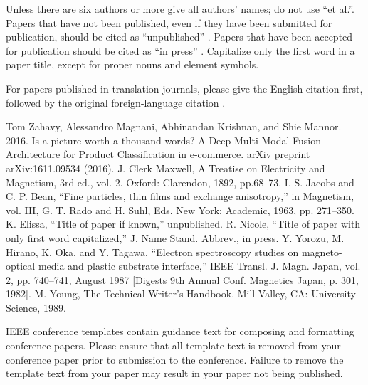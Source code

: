 \documentclass[conference]{IEEEtran}
\begin{document}
Unless there are six authors or more give all authors' names; do not use 
``et al.''. Papers that have not been published, even if they have been 
submitted for publication, should be cited as ``unpublished'' \cite{b4}. Papers 
that have been accepted for publication should be cited as ``in press'' \cite{b5}. 
Capitalize only the first word in a paper title, except for proper nouns and 
element symbols.

For papers published in translation journals, please give the English 
citation first, followed by the original foreign-language citation \cite{b6}.

\begin{thebibliography}{00}
 Tom Zahavy, Alessandro Magnani, Abhinandan Krishnan, and Shie Mannor. 2016.
Is a picture worth a thousand words? A Deep Multi-Modal Fusion Architecture
for Product Classification in e-commerce. arXiv preprint arXiv:1611.09534 (2016).
 J. Clerk Maxwell, A Treatise on Electricity and Magnetism, 3rd ed., vol. 2. Oxford: Clarendon, 1892, pp.68--73.
 I. S. Jacobs and C. P. Bean, ``Fine particles, thin films and exchange anisotropy,'' in Magnetism, vol. III, G. T. Rado and H. Suhl, Eds. New York: Academic, 1963, pp. 271--350.
 K. Elissa, ``Title of paper if known,'' unpublished.
 R. Nicole, ``Title of paper with only first word capitalized,'' J. Name Stand. Abbrev., in press.
 Y. Yorozu, M. Hirano, K. Oka, and Y. Tagawa, ``Electron spectroscopy studies on magneto-optical media and plastic substrate interface,'' IEEE Transl. J. Magn. Japan, vol. 2, pp. 740--741, August 1987 [Digests 9th Annual Conf. Magnetics Japan, p. 301, 1982].
 M. Young, The Technical Writer's Handbook. Mill Valley, CA: University Science, 1989.
\end{thebibliography}
\vspace{12pt}
\color{red}
IEEE conference templates contain guidance text for composing and formatting conference papers. Please ensure that all template text is removed from your conference paper prior to submission to the conference. Failure to remove the template text from your paper may result in your paper not being published.
\end{document}
